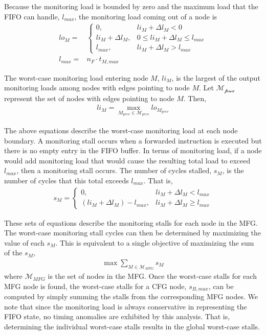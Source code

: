 Because the monitoring load is bounded by zero and the maximum load that
the FIFO can handle, $l_{max}$, the monitoring load coming out of a node is
\begin{align*}
	lo_{M} =& 
		\begin{cases}
			0, &li_{M} + \Delta l_{M} < 0 \\
			li_{M} + \Delta l_{M}, &0 \leq li_{M} + \Delta l_{M} \leq l_{max} \\
			l_{max}, &li_{M} + \Delta l_{M} > l_{max}
		\end{cases} \\
  l_{max} =& n_F \cdot t_{M,max}
\end{align*}

The worst-case monitoring load entering node $M$, $li_{M}$, is the largest of
the output monitoring loads among nodes with edges pointing to node $M$. Let
$\mathcal{M_{\text{prev}}}$ represent the set of nodes with edges pointing to
node $M$. Then,
\begin{align*}
	li_{M} = \max_{M_{prev} \in \mathcal{M}_{prev}}lo_{M_{prev}}
\end{align*}

The above equations describe the worst-case monitoring load at each node
boundary.  A monitoring stall occurs when a forwarded instruction is executed
but there is no empty entry in the FIFO buffer. In terms of monitoring load, if
a node would add monitoring load that would cause the resulting total load to
exceed $l_{max}$, then a monitoring stall occurs. The number of cycles stalled,
$s_{M}$, is the number of cycles that this total exceeds $l_{max}$. That is,
\begin{align*}
	s_{M} =
		\begin{cases}
			0, &li_{M} + \Delta l_{M} < l_{max} \\
			(li_{M} + \Delta l_{M}) - l_{max}, &li_{M} + \Delta l_M \geq l_{max}
		\end{cases}
\end{align*}

These sets of equations describe the monitoring stalls for each node in the MFG.
The worst-case monitoring stall cycles can then be determined by maximizing the
value of each $s_M$. This is equivalent to a single objective of maximizing the
sum of the $s_M$,
\begin{align*}
  \max \sum_{M \in \mathcal{M}_{MFG}} s_{M}
\end{align*}
where $\mathcal{M}_{MFG}$ is the set of nodes in the MFG.  Once the worst-case
stalls for each MFG node is found, the worst-case stalls for a CFG node,
$s_{B,max}$, can be computed by simply summing the stalls from the
corresponding MFG nodes. We note that since the monitoring load is always
conservative in representing the FIFO state, no timing anomalies are exhibited
by this analysis. That is, determining the individual worst-case stalls results
in the global worst-case stalls.

